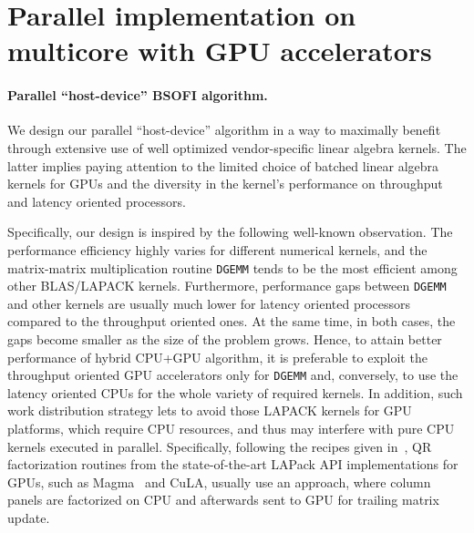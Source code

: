 \documentclass{llncs}
\newcommand{\Lapack}{{\sc LAPack}\xspace}
\newcommand{\Magma}{{\sc Magma}\xspace}
\newcommand{\Cula}{{\sc CuLA}\xspace}
\begin{document}
\section{Parallel implementation on multicore with GPU accelerators}
\label{sec:implementation_on_CPU+GPU}

\paragraph%
{Parallel ``host-device'' BSOFI algorithm.}\label{sec:alrorithms_for_accelerators}

We design our parallel ``host-device'' algorithm in a way to maximally benefit 
through extensive use of well optimized vendor-specific 
linear algebra kernels. %
The latter implies paying attention to 
the limited choice of batched linear algebra kernels for GPUs
and the diversity in the kernel's performance on throughput and latency oriented processors.

Specifically, our design is inspired by the following well-known 
observation. %
The performance efficiency
highly varies for different numerical kernels, 
and the matrix-matrix multiplication routine {\tt DGEMM}
tends to be the most efficient among other BLAS/LAPACK kernels. %
Furthermore, performance gaps between {\tt DGEMM} and other kernels
are usually much lower for 
latency oriented processors compared to the throughput oriented ones.
At the same time, in both cases, the gaps become smaller as the size of the problem grows.
Hence, 
to attain better performance of hybrid CPU+GPU algorithm, 
it is preferable to exploit 
the throughput oriented GPU accelerators only for {\tt DGEMM}
and, conversely, 
to use the latency oriented CPUs for the whole variety of required kernels.
In addition, such work distribution strategy
lets to avoid those LAPACK kernels for GPU platforms,
which require CPU resources, 
and thus may 
interfere with pure CPU kernels
executed in parallel.
Specifically, %
following the recipes given in~\cite{Volkov08LU_QR_Cholesky},
QR factorization routines 
from the state-of-the-art \Lapack API implementations for GPUs,
such as \Magma~\cite{Tomov10Magma} and
\Cula,
usually use an approach, 
where column panels are factorized on CPU 
and afterwards sent to GPU for trailing matrix update.%
\end{document}
